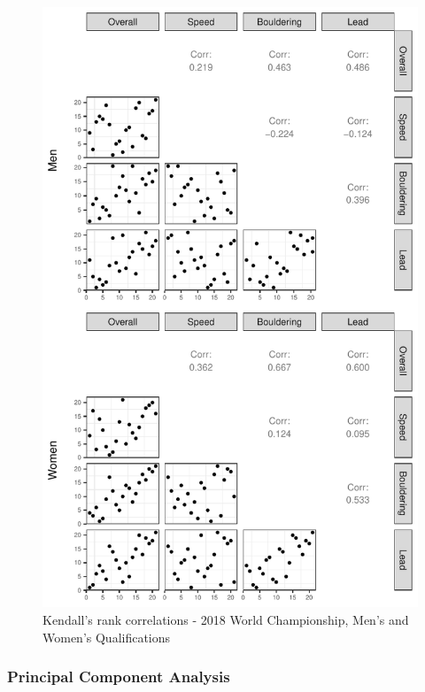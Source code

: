 \documentclass[12pt]{article}
\begin{document}
\begin{figure}

{\centering \includegraphics{draft_files/figure-latex/unnamed-chunk-17-1} 

}

\caption{Kendall's rank correlations - 2018 World Championship, Men's and Women's Qualifications}\label{fig:unnamed-chunk-17}
\end{figure}

\hypertarget{principal-component-analysis}{%
\subsubsection{Principal Component
Analysis}\label{principal-component-analysis}}
\end{document}
